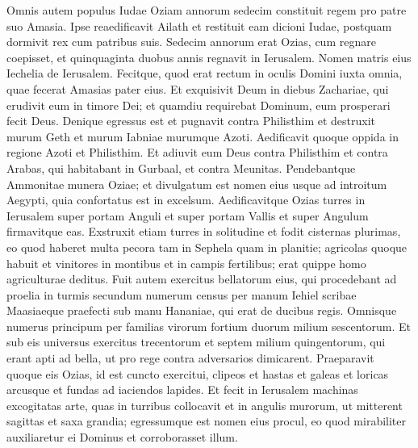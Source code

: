 \begin{biblechapter}
\begin{biblechapter}
\begin{biblechapter}
\begin{biblechapter}
\begin{biblechapter}
\begin{biblechapter}
\begin{biblechapter}
\begin{biblechapter}
\begin{biblechapter}
\begin{biblechapter}
\begin{biblechapter}
\begin{biblechapter}
\begin{biblechapter}
\begin{biblechapter}
\begin{biblechapter}
\begin{biblechapter}
\begin{biblechapter}
\begin{biblechapter}
\begin{biblechapter}
\begin{biblechapter}
\begin{biblechapter}
\begin{biblechapter}
\begin{biblechapter}
\begin{biblechapter}
\begin{biblechapter}
\begin{biblechapter}
\verse Omnis autem populus Iudae Oziam annorum sedecim constituit regem pro patre suo Amasia. 
\verse Ipse reaedificavit Ailath et restituit eam dicioni Iudae, postquam dormivit rex cum patribus suis.
 \verse Sedecim annorum erat Ozias, cum regnare coepisset, et quinquaginta duobus annis regnavit in Ierusalem. Nomen matris eius Iechelia de Ierusalem. 
\verse Fecitque, quod erat rectum in oculis Domini iuxta omnia, quae fecerat Amasias pater eius. 
\verse Et exquisivit Deum in diebus Zachariae, qui erudivit eum in timore Dei; et quamdiu requirebat Dominum, eum prosperari fecit Deus.
 \verse Denique egressus est et pugnavit contra Philisthim et destruxit murum Geth et murum Iabniae murumque Azoti. Aedificavit quoque oppida in regione Azoti et Philisthim. 
\verse Et adiuvit eum Deus contra Philisthim et contra Arabas, qui habitabant in Gurbaal, et contra Meunitas. 
\verse Pendebantque Ammonitae munera Oziae; et divulgatum est nomen eius usque ad introitum Aegypti, quia confortatus est in excelsum.
 \verse Aedificavitque Ozias turres in Ierusalem super portam Anguli et super portam Vallis et super Angulum firmavitque eas. \verse Exstruxit etiam turres in solitudine et fodit cisternas plurimas, eo quod haberet multa pecora tam in Sephela quam in planitie; agricolas quoque habuit et vinitores in montibus et in campis fertilibus; erat quippe homo agriculturae deditus.
 \verse Fuit autem exercitus bellatorum eius, qui procedebant ad proelia in turmis secundum numerum census per manum Iehiel scribae Maasiaeque praefecti sub manu Hananiae, qui erat de ducibus regis. 
\verse Omnisque numerus principum per familias virorum fortium duorum milium sescentorum. 
\verse Et sub eis universus exercitus trecentorum et septem milium quingentorum, qui erant apti ad bella, ut pro rege contra adversarios dimicarent. 
\verse Praeparavit quoque eis Ozias, id est cuncto exercitui, clipeos et hastas et galeas et loricas arcusque et fundas ad iaciendos lapides. 
\verse Et fecit in Ierusalem machinas excogitatas arte, quas in turribus collocavit et in angulis murorum, ut mitterent sagittas et saxa grandia; egressumque est nomen eius procul, eo quod mirabiliter auxiliaretur ei Dominus et corroborasset illum.

\end{biblechapter}
\end{biblechapter}
\end{biblechapter}
\end{biblechapter}
\end{biblechapter}
\end{biblechapter}
\end{biblechapter}
\end{biblechapter}
\end{biblechapter}
\end{biblechapter}
\end{biblechapter}
\end{biblechapter}
\end{biblechapter}
\end{biblechapter}
\end{biblechapter}
\end{biblechapter}
\end{biblechapter}
\end{biblechapter}
\end{biblechapter}
\end{biblechapter}
\end{biblechapter}
\end{biblechapter}
\end{biblechapter}
\end{biblechapter}
\end{biblechapter}
\end{biblechapter}
